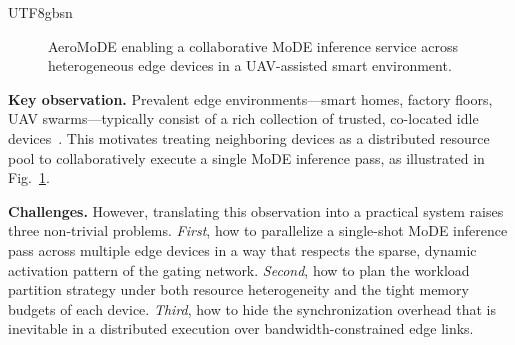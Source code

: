 \documentclass[conference]{IEEEtran}
\begin{document}
\begin{CJK*}{UTF8}{gbsn}
\begin{figure}[t]
  \centering
  \caption{AeroMoDE enabling a collaborative MoDE inference service
           across heterogeneous edge devices in a UAV-assisted smart
           environment.}
  \label{fig:motivation}
\end{figure}

\textbf{Key observation.}  Prevalent edge environments---smart homes,
factory floors, UAV swarms---typically consist of a rich collection of
trusted, co-located idle devices~\cite{zeng2020coedge,ye2022ecofl}.
This motivates treating neighboring devices as a distributed resource
pool to collaboratively execute a single MoDE inference pass, as
illustrated in Fig.~\ref{fig:motivation}.

\textbf{Challenges.}  However, translating this observation into a
practical system raises three non-trivial problems.  \emph{First}, how
to parallelize a single-shot MoDE inference pass across multiple edge
devices in a way that respects the sparse, dynamic activation pattern of
the gating network.  \emph{Second}, how to plan the workload partition
strategy under both resource heterogeneity and the tight memory budgets
of each device.  \emph{Third}, how to hide the synchronization overhead
that is inevitable in a distributed execution over bandwidth-constrained
edge links.


\end{CJK*}
\end{document}
